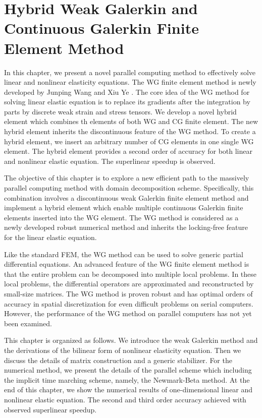 \chapter{Hybrid Weak Galerkin and Continuous Galerkin Finite Element Method}
\label{chapter3}

In this chapter, we present a novel parallel computing method to effectively solve linear and nonlinear elasticity equations. The WG finite element method is newly developed by Junping Wang and Xiu Ye \cite{wang2013weak}. The core idea of the WG method for solving linear elastic equation is to replace its gradients after the integration by parts by discrete weak strain and stress tensors. We develop a novel hybrid element which combines th elements of both WG and CG finite element. The new hybrid element inherits the discontinuous feature of the WG method. To create a hybrid element, we insert an arbitrary number of CG elements in one single WG element. The hybrid element provides a second order of accuracy for both linear and nonlinear elastic equation. The superlinear speedup is observed.

The objective of this chapter is to explore a new efficient path to the massively parallel computing method with domain decomposition scheme. Specifically, this combination involves a discontinuous weak Galerkin finite element method\cite{wang2013weak, li2013weak, wang2014weak} and implement a hybrid element which enable multiple continuous Galerkin finite elements inserted into the WG element. The WG method is considered as a newly developed robust numerical method and inherits the locking-free feature for the linear elastic equation\cite{wang2016locking}.

Like the standard FEM, the WG method can be used to solve generic partial differential equations. An advanced feature of the WG finite element method is that the entire problem can be decomposed into multiple local problems. In these local problems, the differential operators are approximated and reconstructed by small-size matrices. The WG method is proven robust and has optimal orders of accuracy in spatial discretization for even difficult problems on serial computers. However, the performance of the WG method on parallel computers has not yet been examined.

This chapter is organized as follows. We introduce the weak Galerkin method and the derivations of the bilinear form of nonlinear elasticity equation. Then we discuss the details of matrix construction and a generic stabilizer. For the numerical method, we present the details of the parallel scheme which including the implicit time marching scheme, namely, the Newmark-Beta method\cite{adeli1978algorithms}. At the end of this chapter, we show the numerical results of one-dimensional linear and nonlinear elastic equation. The second and third order accuracy achieved with observed superlinear speedup.

